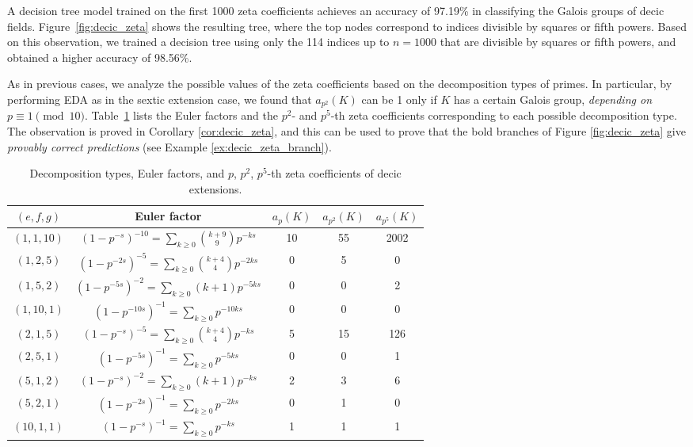 \documentclass[letterpaper, 10pt]{article}
\newcommand{\1}{\mathds{1}}	%
\theoremstyle{definition}
\theoremstyle{remark}
\begin{document}
A decision tree model trained on the first 1000 zeta coefficients achieves an accuracy of 97.19\% in classifying the Galois groups of decic fields.  
Figure~\ref{fig:decic_zeta} shows the resulting tree, where the top nodes correspond to indices divisible by squares or fifth powers.  
Based on this observation, we trained a decision tree using only the 114 indices up to \( n = 1000 \) that are divisible by squares or fifth powers, and obtained a higher accuracy of 98.56\%.

As in previous cases, we analyze the possible values of the zeta coefficients based on the decomposition types of primes.
 In particular, by performing EDA as in the sextic extension case, we found that $a_{p^2}(K)$ can be 1 only if $K$ has a certain Galois group, \emph{depending on $p \equiv 1 \pmod{10}$}.
Table~\ref{tab:deciceuler} lists the Euler factors and the $p^2$- and  $p^5$-th zeta coefficients corresponding to each possible decomposition type.
 The observation is proved in Corollary \ref{cor:decic_zeta}, and this can be used to prove that the bold branches of Figure \ref{fig:decic_zeta} give \emph{provably correct predictions} (see Example \ref{ex:decic_zeta_branch}).


\begin{table}[h]
    \begin{center}
        \begin{tabular}{c|c|c|c|c}
            \toprule
            $(e, f, g)$ & Euler factor & $a_{p}(K)$ & $a_{p^2}(K)$ & $a_{p^5}(K)$   \\
            \midrule
            $(1, 1, 10)$ & $(1 - p^{-s})^{-10} = \sum_{k \ge 0} \binom{k+9}{9} p^{-ks}$ & 10 & 55 & 2002 \\
            $(1, 2, 5)$ & $(1 - p^{-2s})^{-5} = \sum_{k \ge 0} \binom{k+4}{4} p^{-2ks}$ & 0 & 5 & 0\\
            $(1, 5, 2)$ & $(1 - p^{-5s})^{-2} = \sum_{k \ge 0} (k+1)p^{-5ks}$ & 0 & 0 & 2\\
            $(1, 10, 1)$ & $(1 - p^{-10s})^{-1} = \sum_{k \ge 0} p^{-10ks}$ & 0 & 0 & 0 \\
            $(2, 1, 5)$ & $(1 - p^{-s})^{-5} = \sum_{k \ge 0} \binom{k+4}{4} p^{-ks}$ & 5 &  15 & 126 \\
            $(2, 5, 1)$ & $(1 - p^{-5s})^{-1} = \sum_{k \ge 0} p^{-5ks}$ & 0 & 0 & 1 \\
            $(5, 1, 2)$ & $(1 - p^{-s})^{-2} = \sum_{k \ge 0} (k+1)p^{-ks}$ & 2 & 3 & 6 \\
            $(5, 2, 1)$ & $(1 - p^{-2s})^{-1} = \sum_{k \ge 0} p^{-2ks}$ & 0 & 1 & 0 \\
            $(10, 1, 1)$ & $(1 - p^{-s})^{-1} = \sum_{k \ge 0} p^{-ks}$ & 1 & 1 & 1\\
            \bottomrule
        \end{tabular}
        \caption{Decomposition types, Euler factors, and $p$, $p^2$, $p^5$-th zeta coefficients of decic extensions.}
        \label{tab:deciceuler}
    \end{center}
\end{table}
\end{document}
